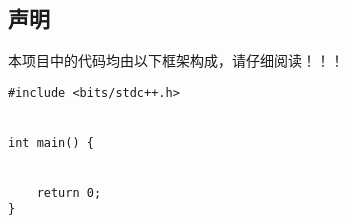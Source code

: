 \begin{center}
    \section*{声明}
\end{center}

本项目中的代码均由以下框架构成，请仔细阅读！！！
\begin{lstlisting}
#include <bits/stdc++.h>


int main() {
    

    return 0;
}
\end{lstlisting}